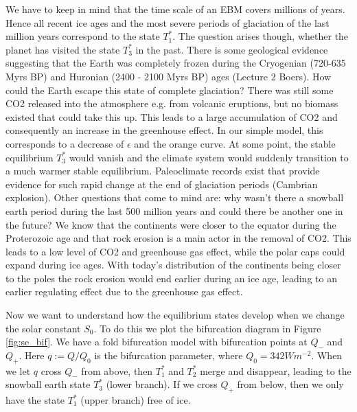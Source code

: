 \documentclass[%
thesis=student,%
coverpage=false,%
titlepage=false,%
headmarks=true, %
english,%
font=libertine, %
math=newpxtx, %
BCOR=5mm,%
coverBCOR=11mm%
]{tumbook}
\begin{document}
We have to keep in mind that the time scale of an EBM covers millions of years. Hence all recent ice ages and the most severe periods of glaciation of the last million years correspond to the state $T_{1}^*$. The question arises though, whether the planet has visited the state $T_{3}^*$ in the past. There is some geological evidence suggesting that the Earth was completely frozen during the Cryogenian (720-635 Myrs BP) and Huronian (2400 - 2100 Myrs BP) ages (Lecture 2 Boers). How could the Earth escape this state of complete glaciation? There was still some CO2 released into the atmosphere e.g. from volcanic eruptions, but no biomass existed that could take this up. This leads to a large accumulation of CO2 and consequently an increase in the greenhouse effect. In our simple model, this corresponds to a decrease of $\epsilon$ and the orange curve. At some point, the stable equilibrium $T_{3}^*$ would vanish and the climate system would suddenly transition to a much warmer stable equilibrium. Paleoclimate records exist that provide evidence for such rapid change at the end of glaciation periods (Cambrian explosion). Other questions that come to mind are: why wasn't there a snowball earth period during the last 500 million years and could there be another one in the future? We know that the continents were closer to the equator during the Proterozoic age and that rock erosion is a main actor in the removal of CO2. This leads to a low level of CO2 and greenhouse gas effect, while the polar caps could expand during ice ages. With today's distribution of the continents being closer to the poles the rock erosion would end earlier during an ice age, leading to an earlier regulating effect due to the greenhouse gas effect. 

Now we want to understand how the equilibrium states develop when we change the solar constant $S_{0}$. To do this we plot the bifurcation diagram in Figure \ref{fig:se_bif}. We have a fold bifurcation model with bifurcation points at $Q_{-}$ and $Q_{+}$. Here $q := Q/Q_{0}$ is the bifurcation parameter, where $Q_{0} = 342 Wm^{-2}$. When we let $q$ cross $Q_{-}$ from above, then $T_{1}^*$ and $T_{2}^*$ merge and disappear, leading to the snowball earth state $T_{3}^*$ (lower branch). If we cross $Q_{+}$ from below, then we only have the state $T_{1}^*$ (upper branch) free of ice. 
\end{document}
